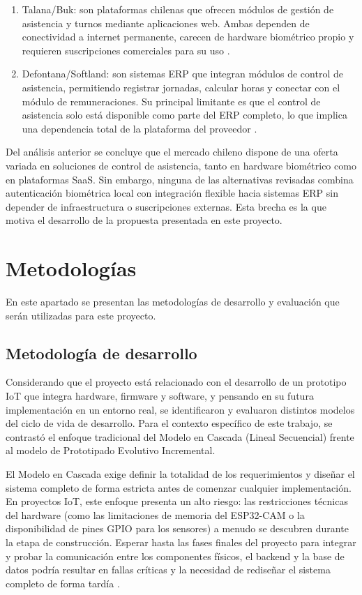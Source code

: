 \documentclass{iccmemoria}
\begin{document}
\begin{enumerate}
    \item Talana/Buk: son plataformas chilenas que ofrecen módulos de gestión de asistencia y turnos mediante aplicaciones web. Ambas dependen de conectividad a internet permanente, carecen de hardware biométrico propio y requieren suscripciones comerciales para su uso \cite{talana_software} \cite{buk_asistencia}.
    \item Defontana/Softland: son sistemas ERP que integran módulos de control de asistencia, permitiendo registrar jornadas, calcular horas y conectar con el módulo de remuneraciones. Su principal limitante es que el control de asistencia solo está disponible como parte del ERP completo, lo que implica una dependencia total de la plataforma del proveedor \cite{defontana_software} \cite{softland_chile}.
\end{enumerate}

Del análisis anterior se concluye que el mercado chileno dispone de una oferta variada en soluciones de control de asistencia, tanto en hardware biométrico como en plataformas SaaS. Sin embargo, ninguna de las alternativas revisadas combina autenticación biométrica local con integración flexible hacia sistemas ERP sin depender de infraestructura o suscripciones externas. Esta brecha es la que motiva el desarrollo de la propuesta presentada en este proyecto.

\section{Metodologías}
En este apartado se presentan las metodologías de desarrollo y evaluación que serán utilizadas para este proyecto.

\subsection{Metodología de desarrollo}

Considerando que el proyecto está relacionado con el desarrollo de un prototipo IoT que integra hardware, firmware y software, y pensando en su futura implementación en un entorno real, se identificaron y evaluaron distintos modelos del ciclo de vida de desarrollo. Para el contexto específico de este trabajo, se contrastó el enfoque tradicional del Modelo en Cascada (Lineal Secuencial) frente al modelo de Prototipado Evolutivo Incremental.

El Modelo en Cascada exige definir la totalidad de los requerimientos y diseñar el sistema completo de forma estricta antes de comenzar cualquier implementación. En proyectos IoT, este enfoque presenta un alto riesgo: las restricciones técnicas del hardware (como las limitaciones de memoria del ESP32-CAM o la disponibilidad de pines GPIO para los sensores) a menudo se descubren durante la etapa de construcción. Esperar hasta las fases finales del proyecto para integrar y probar la comunicación entre los componentes físicos, el backend y la base de datos podría resultar en fallas críticas y la necesidad de rediseñar el sistema completo de forma tardía \cite{pressman2021}.
\end{document}
